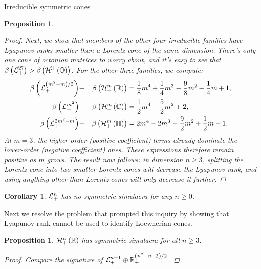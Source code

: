 \documentclass{interact}
\theoremstyle{plain}
\newtheorem{corollary}[theorem]{Corollary}
\newtheorem{proposition}[theorem]{Proposition}
\theoremstyle{definition}
\theoremstyle{remark}
\begin{document}
\begin{section}{Irreducible symmetric cones}
\begin{proposition}
\begin{proof}
        Next, we show that members of the other four irreducible
        families have Lyapunov ranks smaller than a Lorentz cone of
        the same dimension. There's only one cone of octonion matrices
        to worry about, and it's easy to see that
        $\lyapunovrank{\Lnplus[27]} >
        \lyapunovrank{\Hnplus[3]\of{\octonions}}$. For the other three
        families, we compute:
        \begin{alignat*}{3}
          \lyapunovrank{\Lnplus[\qty{m^{2}+m}/2]}
          &-&
          \lyapunovrank{\Hnplus[m]\of{\Rn[1]}}
          &=
          \frac{1}{8}m^{4} + \frac{1}{4}m^{3} - \frac{9}{8}m^{2} - \frac{1}{4}m + 1,
          \\
          \lyapunovrank{\Lnplus[m^{2}]}
          &-&
          \lyapunovrank{\Hnplus[m]\of{\Cn[1]}}
          &=
          \frac{1}{2}m^{4} - \frac{5}{2}m^{2} + 2,
          \\
          \lyapunovrank{\Lnplus[2m^{2} - m]}
          &-&
          \lyapunovrank{\Hnplus[m]\of{\quaternions}}
          &=
          2m^{4} - 2m^{3} - \frac{9}{2}m^{2} + \frac{1}{2}m + 1.
        \end{alignat*}
        At $m = 3$, the higher-order (positive coefficient) terms
        already dominate the lower-order (negative coefficient)
        ones. These expressions therefore remain positive as $m$
        grows. The result now follows: in dimension $n \ge 3$,
        splitting the Lorentz cone into two smaller Lorentz cones will
        decrease the Lyapunov rank, and using anything other than
        Lorentz cones will only decrease it further.
      \end{proof}
    \end{proposition}

    \begin{corollary}\label{cor:lorentz cone has no simulacra}
      $\Lnplus$ has no symmetric simulacra for any $n \ge 0$.
    \end{corollary}

    Next we resolve the problem that prompted this inquiry by showing
    that Lyapunov rank cannot be used to identify Loewnerian cones.

    \begin{proposition}\label{prop:real psd simulacra}
      $\Hnplus\of{\Rn[1]}$ has symmetric simulacra for all $n \ge 3$.
      \begin{proof}
        Compare the signature of $\Lnplus[n+1] \oplus
        \Rnplus[\qty{n^{2} - n - 2}/2]$.
      \end{proof}
    \end{proposition}


\end{section}
\end{document}

